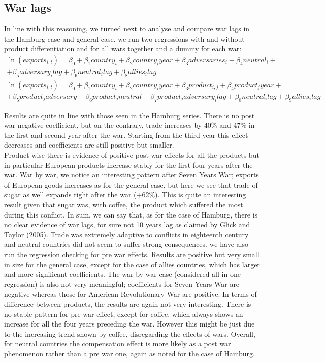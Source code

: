 \documentclass[12pt,a4paper,notitlepage,english]{article}
\begin{document}
\subsection{War lags}
In line with this reasoning, we turned next to analyse and compare war lags in the Hamburg case and general case. we run two regressions with and without product differentiation and for all wars together and a dummy for each war: 
\begin{multline}
\ln(exports_{i,t})=\beta_0+\beta_1country_i+\beta_2country_iyear+\beta_3adversaries_i+\beta_4neutral_i+\\+\beta_5adversary_ilag+\beta_6neutral_ilag+\beta_8allies_ilag
\end{multline}
\begin{multline}
\ln(exports_{i,t})=\beta_0+\beta_1country_i+\beta_2country_iyear+\beta_3product_{i,j}+\beta_4product_jyear+\\+\beta_5product_jadversary+ \beta_6product_jneutral+\beta_7product_jadversary_ilag+\beta_8neutral_ilag+\beta_9allies_ilag
\end{multline}

Results are quite in line with those seen in the Hamburg series. There is no post war negative coefficient, but on the contrary, trade increases by 40\% and 47\% in the first and second year after the war. Starting from the third year this effect decreases and coefficients are still positive but smaller. \\
Product-wise there is evidence of positive post war effects for all the products but in particular European products increase stably for the first four years after the war. War by war, we notice an interesting pattern after Seven Years War; exports of European goods increases as for the general case, but here we see that trade of sugar as well expands right after the war (+62\%). This is quite an interesting result given that sugar was, with coffee, the product which suffered the most during this conflict. 
In sum, we can say that, as for the case of Hamburg, there is no clear evidence of war lags, for sure not 10 years lag as claimed by Glick and Taylor (2005). Trade was extremely adaptive to conflicts in eighteenth century and neutral countries did not seem to suffer strong consequences.
we have also run the regression checking for pre war effects. Results are positive but very small in size for the general case, except for the case of allies countries, which has larger and more significant coefficients. The war-by-war case (considered all in one regression) is also not very meaningful; coefficients for Seven Years War are negative whereas those for American Revolutionary War are positive. In terms of difference between products, the results are again not very interesting. There is no stable pattern for pre war effect, except for coffee, which always shows an increase for all the four years preceding the war. However this might be just due to the increasing trend shown by coffee, disregarding the effects of wars.
Overall, for neutral countries the compensation effect is more likely as a post war phenomenon rather than a pre war one, again as noted for the case of Hamburg. 
\fi
\end{document}

